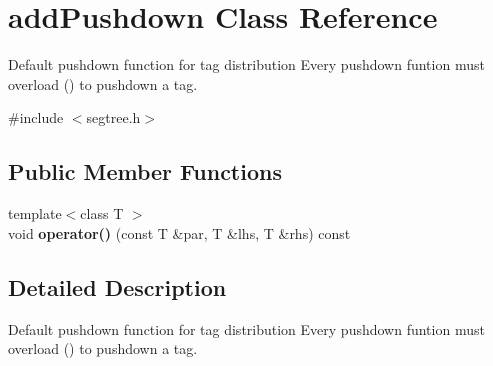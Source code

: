 \hypertarget{classadd_pushdown}{}\section{add\+Pushdown Class Reference}
\label{classadd_pushdown}


Default pushdown function for tag distribution Every pushdown funtion must overload () to pushdown a tag.  




{\ttfamily \#include $<$segtree.\+h$>$}

\subsection*{Public Member Functions}
\begin{DoxyCompactItemize}
\item 
\mbox{\label{classadd_pushdown_a0d29e7fb9374d0438cb0759a3e0e5328}} 
{\footnotesize template$<$class T $>$ }\\void {\bfseries operator()} (const T \&par, T \&lhs, T \&rhs) const
\end{DoxyCompactItemize}


\subsection{Detailed Description}
Default pushdown function for tag distribution Every pushdown funtion must overload () to pushdown a tag. 